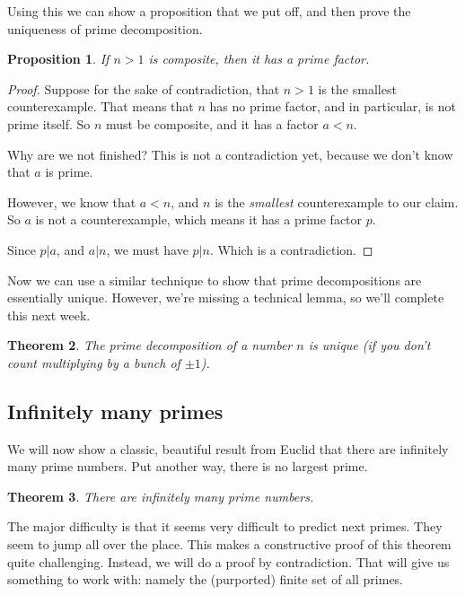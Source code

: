 \documentclass[11pt]{article}
\newtheorem{thm}{Theorem}
\newtheorem{prop}[thm]{Proposition}
\theoremstyle{definition}
\numberwithin{thm}{section}
\begin{document}
Using this we can show a proposition that we put off, and then prove the uniqueness of prime decomposition.

\begin{prop} If $n>1$ is composite, then it has a prime factor.
\end{prop}

\begin{proof} Suppose for the sake of contradiction, that $n>1$ is the smallest counterexample. That means that $n$ has no prime factor, and in particular, is not prime itself. So $n$ must be composite, and it has a factor $a < n$. 

Why are we not finished? This is not a contradiction yet, because we don't know that $a$ is prime.

However, we know that $a < n$, and $n$ is the \textit{smallest} counterexample to our claim. So $a$ is not a counterexample, which means it has a prime factor $p$.

Since $p | a$, and $a | n$, we must have $p | n$. Which is a contradiction.
\end{proof}

Now we can use a similar technique to show that prime decompositions are essentially unique. However, we're missing a technical lemma, so we'll complete this next week.

\begin{thm} The prime decomposition of a number $n$ is unique (if you don't count multiplying by a bunch of $\pm 1$).
\end{thm}

\subsection{Infinitely many primes}

We will now show a classic, beautiful result from Euclid that there are infinitely many prime numbers. Put another way, there is no largest prime.

\begin{thm} There are infinitely many prime numbers.
\end{thm}

The major difficulty is that it seems very difficult to predict next primes. They seem to jump all over the place. This makes a constructive proof of this theorem quite challenging. Instead, we will do a proof by contradiction. That will give us something to work with: namely the (purported) finite set of all primes.
\end{document}
